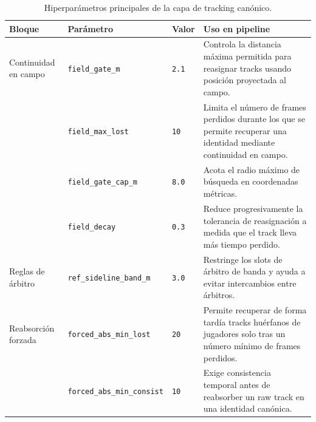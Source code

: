 \begin{table}[htbp]
\centering
\scriptsize
\setlength{\tabcolsep}{3pt}
\renewcommand{\arraystretch}{1.12}
\begin{tabularx}{\textwidth}{
>{\raggedright\arraybackslash}p{2.6cm}
>{\raggedright\arraybackslash}p{3.4cm}
>{\raggedright\arraybackslash}p{1.5cm}
>{\raggedright\arraybackslash}X
}
\toprule
\textbf{Bloque} & \textbf{Parámetro} & \textbf{Valor} & \textbf{Uso en pipeline} \\
\midrule

Continuidad en campo &
\texttt{field\_gate\_m} &
\texttt{2.1} &
Controla la distancia máxima permitida para reasignar tracks usando posición proyectada al campo. \\

&
\texttt{field\_max\_lost} &
\texttt{10} &
Limita el número de frames perdidos durante los que se permite recuperar una identidad mediante continuidad en campo. \\

&
\texttt{field\_gate\_cap\_m} &
\texttt{8.0} &
Acota el radio máximo de búsqueda en coordenadas métricas. \\

&
\texttt{field\_decay} &
\texttt{0.3} &
Reduce progresivamente la tolerancia de reasignación a medida que el track lleva más tiempo perdido. \\

\midrule

Reglas de árbitro &
\texttt{ref\_sideline\_band\_m} &
\texttt{3.0} &
Restringe los slots de árbitro de banda y ayuda a evitar intercambios entre árbitros. \\

\midrule

Reabsorción forzada &
\texttt{forced\_abs\_min\_lost} &
\texttt{20} &
Permite recuperar de forma tardía tracks huérfanos de jugadores solo tras un número mínimo de frames perdidos. \\

&
\texttt{forced\_abs\_min\_consist} &
\texttt{10} &
Exige consistencia temporal antes de reabsorber un raw track en una identidad canónica. \\

\bottomrule
\end{tabularx}

\caption[Hiperparámetros de la capa de tracking canónico]{
Hiperparámetros principales de la capa de tracking canónico.}
\label{tab:hiperparametros-canonico}
\end{table}

